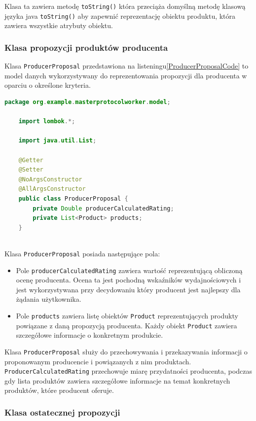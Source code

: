 Klasa ta zawiera metodę \verb|toString()| która przeciąża domyślną metodę klasową języka java \verb|toString()| aby zapewnić reprezentację obiektu produktu, która zawiera wszystkie atrybuty obiektu.


\subsubsection{Klasa propozycji produktów producenta}

Klasa \verb|ProducerProposal| przedstawiona na listeningu\ref{ProducerProposalCode} to model danych wykorzystywany do reprezentowania propozycji dla producenta w oparciu o określone kryteria.

\begin{lstlisting}[language=Java, caption=Kod klasy ProducerProposal,label=ProducerProposalCode]
    package org.example.masterprotocolworker.model;

    import lombok.*;
    
    import java.util.List;
    
    @Getter
    @Setter
    @NoArgsConstructor
    @AllArgsConstructor
    public class ProducerProposal {
        private Double producerCalculatedRating;
        private List<Product> products;
    }
    
\end{lstlisting}

Klasa \verb|ProducerProposal| posiada następujące pola:
\begin{itemize}
    \item Pole \verb|producerCalculatedRating| zawiera wartość reprezentującą obliczoną ocenę producenta. Ocena ta jest pochodną wskaźników wydajnościowych i jest wykorzystywana przy decydowaniu który producent jest najlepszy dla żądania użytkownika.
    \item Pole \verb|products| zawiera listę obiektów \verb|Product| reprezentujących produkty powiązane z daną propozycją producenta. Każdy obiekt \verb|Product| zawiera szczegółowe informacje o konkretnym produkcie.
\end{itemize}

Klasa \verb|ProducerProposal| służy do przechowywania i przekazywania informacji o proponowanym producencie i powiązanych z nim produktach. \verb|ProducerCalculatedRating| przechowuje miarę przydatności producenta, podczas gdy lista produktów zawiera szczegółowe informacje na temat konkretnych produktów, które producent oferuje.

\subsubsection{Klasa ostatecznej propozycji}

